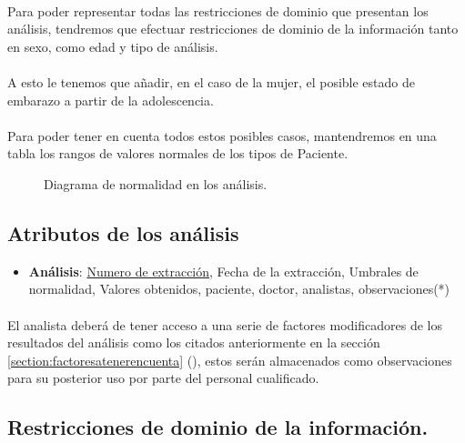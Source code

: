 \documentclass[a4paper,10pt]{article}
\begin{document}
\paragraph{}
Para poder representar todas las restricciones de dominio que presentan los análisis, tendremos que efectuar restricciones de dominio de la información tanto en sexo, como edad y tipo de análisis.
\paragraph{}
A esto le tenemos que añadir, en el caso de la mujer, el posible estado de embarazo a partir de la adolescencia.
\paragraph{}
Para poder tener en cuenta todos estos posibles casos, mantendremos en una tabla los rangos de valores normales de los tipos de Paciente.\\
\begin{figure}[hbt]
	\begin{center}
		\scalebox{0.8}{}
	\end{center}
	\caption{Diagrama de normalidad en los análisis.}
	\label{fig:clases_analisis_normales}
\end{figure}

\pagebreak

\subsection{Atributos de los análisis}
\begin{itemize}
	\item {\bf Análisis}: \underline{Numero de extracción}, Fecha de la extracción, Umbrales de normalidad, Valores obtenidos, paciente, doctor, analistas, observaciones(*)
\end{itemize}

\paragraph{}
El analista deberá de tener acceso a una serie de factores modificadores de los resultados del análisis como los citados anteriormente en la sección
\ref{section:factoresatenerencuenta} (), estos serán almacenados como observaciones para su posterior uso por parte del personal cualificado.


\subsection{Restricciones de dominio de la información.}
\end{document}
